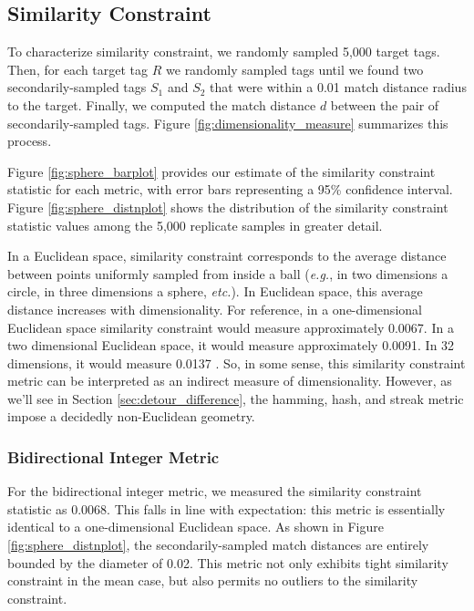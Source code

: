 \subsection{Similarity Constraint} \label{sec:similarityconstriant}



To characterize similarity constraint, we randomly sampled 5,000 target tags.
Then, for each target tag $R$ we randomly sampled tags until we found two secondarily-sampled tags $S_1$ and $S_2$ that were within a 0.01 match distance radius to the target.
Finally, we computed the match distance $d$ between the pair of secondarily-sampled tags.
Figure \ref{fig:dimensionality_measure} summarizes this process.

Figure \ref{fig:sphere_barplot} provides our estimate of the similarity constraint statistic for each metric, with error bars representing a 95\% confidence interval.
Figure \ref{fig:sphere_distnplot} shows the distribution of the similarity constraint statistic values among the 5,000 replicate samples in greater detail.

In a Euclidean space, similarity constraint corresponds to the average distance between points uniformly sampled from inside a ball (\textit{e.g.}, in two dimensions a circle, in three dimensions a sphere, \textit{etc.}).
In Euclidean space, this average distance increases with dimensionality.
For reference, in a one-dimensional Euclidean space similarity constraint would measure approximately 0.0067.
In a two dimensional Euclidean space, it would measure approximately  0.0091.
In 32 dimensions, it would measure 0.0137 \citep{dunbar1997average}.
So, in some sense, this similarity constraint metric can be interpreted as an indirect measure of dimensionality.
However, as we'll see in Section \ref{sec:detour_difference}, the hamming, hash, and streak metric impose a decidedly non-Euclidean geometry.

\subsubsection{Bidirectional Integer Metric}

For the bidirectional integer metric, we measured the similarity constraint statistic as 0.0068.
This falls in line with expectation: this metric is essentially identical to a one-dimensional Euclidean space.
As shown in Figure \ref{fig:sphere_distnplot}, the secondarily-sampled match distances are entirely bounded by the diameter of 0.02.
This metric not only exhibits tight similarity constraint in the mean case, but also permits no outliers to the similarity constraint.

